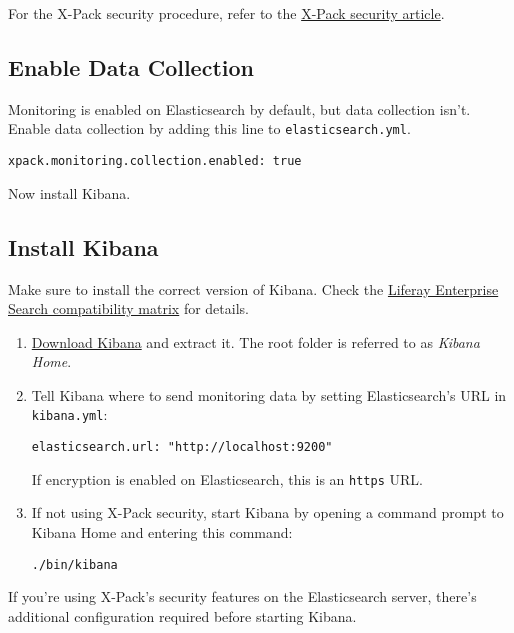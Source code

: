 For the X-Pack security procedure, refer to the
\href{/docs/7-0/deploy/-/knowledge_base/d/securing-elasticsearch-6-with-x-pack}{X-Pack
security article}.

\subsection{Enable Data Collection}\label{enable-data-collection}

Monitoring is enabled on Elasticsearch by default, but data collection
isn't. Enable data collection by adding this line to
\texttt{elasticsearch.yml}.

\begin{verbatim}
xpack.monitoring.collection.enabled: true
\end{verbatim}

Now install Kibana.

\subsection{Install Kibana}\label{install-kibana}

Make sure to install the correct version of Kibana. Check the
\href{https://help.liferay.com/hc/en-us/articles/360016511651\#Liferay-Enterprise-Search}{Liferay
Enterprise Search compatibility matrix} for details.

\begin{enumerate}
\def\labelenumi{\arabic{enumi}.}
\item
  \href{https://www.elastic.co/downloads/kibana}{Download Kibana} and
  extract it. The root folder is referred to as \emph{Kibana Home}.
\item
  Tell Kibana where to send monitoring data by setting Elasticsearch's
  URL in \texttt{kibana.yml}:

\begin{verbatim}
elasticsearch.url: "http://localhost:9200"
\end{verbatim}

  If encryption is enabled on Elasticsearch, this is an \texttt{https}
  URL.
\item
  If not using X-Pack security, start Kibana by opening a command prompt
  to Kibana Home and entering this command:

\begin{verbatim}
./bin/kibana
\end{verbatim}
\end{enumerate}

If you're using X-Pack's security features on the Elasticsearch server,
there's additional configuration required before starting Kibana.

